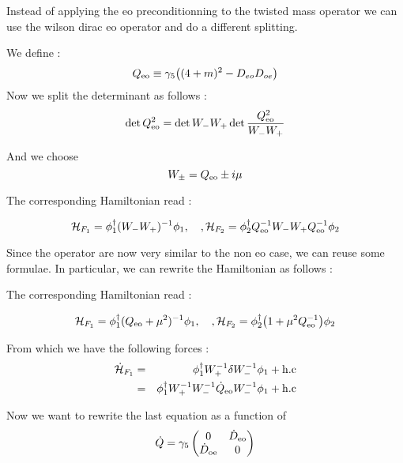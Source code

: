 \documentclass{article}[12pt]
\begin{document}
Instead of applying the eo preconditionning to the twisted mass
operator we can use the wilson dirac eo operator and do a different
splitting.


We define :
\begin{equation}
Q_{\rm{eo}} \equiv \gamma_5 \big( (4+m)^2 - D_{eo} D_{oe}\big)
\end{equation}
Now we split the determinant as follows :
\begin{equation}
\det{ Q_{\rm{eo}} ^2 }  = \det{W_- W_+} \det{\frac{  Q_{\rm{eo}} ^2
  }{W_- W_+}}
\end{equation}

And we choose
\begin{equation}
W_{\pm} = Q_{\rm{eo}} \pm i \mu
\end{equation}

The corresponding Hamiltonian read :

\begin{equation}
\mathcal{H}_{F_1} =   \phi_1^\dagger ( W_- W_+ )^{-1} \phi_1,\quad,
\mathcal{H}_{F_2} = \phi_2^\dagger Q_{\rm{eo}}^{-1} W_- W_+ Q_{\rm{eo}}^{-1} \phi_2
\end{equation}

Since the operator are now very similar to the non eo case, we can
reuse some formulae. In particular, we can rewrite the Hamiltonian as
follows :

The corresponding Hamiltonian read :

\begin{equation}
\mathcal{H}_{F_1} =   \phi_1^\dagger (Q_{\rm{eo}}  + \mu^2  )^{-1} \phi_1,\quad,
\mathcal{H}_{F_2} = \phi_2^\dagger \big( 1  + \mu^2 Q_{\rm{eo}}^{-1}\big)  \phi_2
\end{equation}





From which we have the following forces :
\begin{eqnarray}
\dot{\mathcal{H}}_{F_1} &=&   \phi_1^\dagger  W_+^{-1} \delta
W_-^{-1}\phi_1 + \rm{h.c} \\
&=&  \phi_1^\dagger  W_+^{-1}  W_-^{-1} \dot{Q}_{\rm{eo}} W_-^{-1} \phi_1+ \rm{h.c}
\end{eqnarray}

Now we want to rewrite the last equation as a function of
\begin{equation}
\dot{Q} = \gamma_5  \begin{pmatrix}  0 & \dot{D}_{\rm{eo}} \\
  \dot{D}_{\rm{oe}} & 0  \end{pmatrix}
\end{equation}
\end{document}
